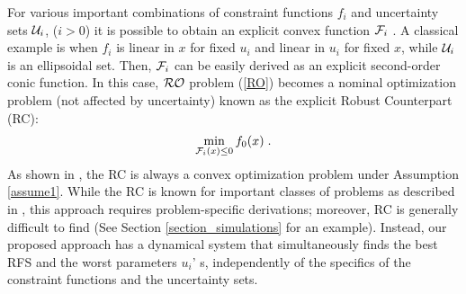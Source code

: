 \documentclass[journal,twoside,web]{ieeecolor}
\begin{document}
For various important combinations of constraint functions $f_i$ and uncertainty sets ${\cal U}_i$, ($i>0$) it is possible to obtain an explicit convex function ${\cal F}_i$ \cite{bental2009}. A classical example is when $f_i$ is linear in $x$ for fixed $u_i$ and linear in $u_i$ for fixed $x$, while ${\cal U}_i$ is an ellipsoidal set. 
Then, ${\cal F}_i$ can be easily derived as an explicit second-order conic function. 
In this case, ${\cal RO}$ problem (\ref{RO}) becomes a nominal optimization problem (not affected by uncertainty) known as the explicit Robust Counterpart (RC):
\begin{align} \label{rc}
\displaystyle \min_{{\cal F}_i(x)\leq 0} f_0(x)\;.
\end{align}
As shown in \cite{bental2009-2}, the RC is always a convex optimization problem under Assumption \ref{assume1}. While the RC is known for important classes of problems as described in \cite{bertsimas2011}, this approach requires problem-specific derivations; moreover, RC is generally difficult to find (See Section \ref{section_simulations} for an example). Instead, our proposed approach has a dynamical system that simultaneously finds the best RFS and the worst parameters $u_i$' s, independently of the specifics of the constraint functions and the uncertainty sets.

\end{document}
